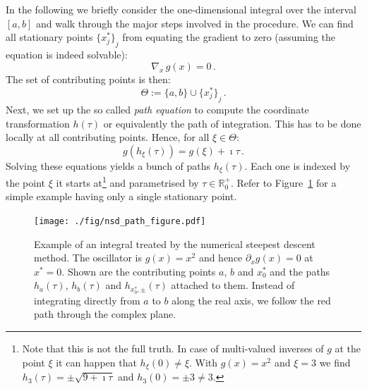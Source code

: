 \documentclass[a4paper,10pt]{article}
\begin{document}
In the following we briefly consider the one-dimensional integral over the interval
$[a,b]$ and walk through the major steps involved in the procedure. We can find all
stationary points ${\{x_{j}^{*}\}}_{j}$ from equating the gradient to zero (assuming
the equation is indeed solvable):
\begin{equation}
  \nabla_{x} \, g(x) = 0 \,.
\end{equation}
The set of contributing points is then:
\begin{equation}
  \Theta := \{a, b\} \cup {\{x^{*}_j\}}_j \,.
\end{equation}
Next, we set up the so called \emph{path equation} to compute the coordinate
transformation $h(\tau)$ or equivalently the path of integration. This has to
be done locally at all contributing points. Hence, for all $\xi \in \Theta$:
\begin{equation}
  g(h_\xi(\tau)) = g(\xi) + \imath \tau \,.
\end{equation}
Solving these equations yields a bunch of paths $h_{\xi}(\tau)$. Each one is
indexed by the point $\xi$ it starts at\footnote{Note that this is not the full truth.
In case of multi-valued inverses of $g$ at the point $\xi$ it can happen that
$h_\xi(0) \neq \xi$. With $g (x)= x^2$ and $\xi = 3$ we find $h_3(\tau) = \pm \sqrt{9+\imath\tau}$
and $h_3(0) = \pm 3 \neq 3$.}
and parametrised by $\tau \in \mathbb{R}_0^{+}$.
Refer to Figure~\ref{fig:nsd_path_example} for a simple example having only a single
stationary point.

\begin{figure}
  \centering
  \texttt{[image: ./fig/nsd\_path\_figure.pdf]}
  \caption{Example of an integral treated by the numerical steepest descent method.
  The oscillator is $g(x) = x^2$ and hence $\partial_x g(x) = 0$ at $x^{*} = 0$.
  Shown are the contributing points $a$, $b$ and $x_0^{*}$ and the paths
  $h_a(\tau)$, $h_b(\tau)$ and $h_{x_0^{*},\pm}(\tau)$ attached to them.
  Instead of integrating directly from $a$ to $b$ along the real axis, we follow
  the red path through the complex plane.}
  \label{fig:nsd_path_example}
\end{figure}
\end{document}
